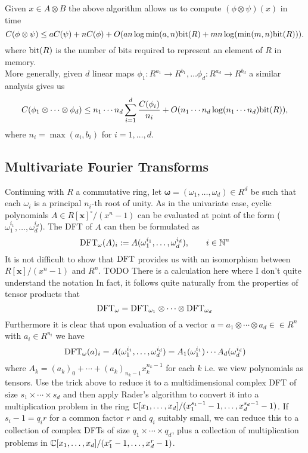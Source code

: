 Given $x \in A \otimes B$ the above algorithm allows us to compute $(\phi \otimes \psi) (x)$ in time
\[
    C(\phi \otimes \psi) \leq aC(\psi) + nC(\phi) + O(a n \log \min(a, n) \textrm{bit}(R) + m n \log( \min (m, n)\textrm{bit}(R))).
\]
where $\textrm{bit}(R)$ is the number of bits required to represent an element of $R$ in memory.\\
More generally, given $d$ linear maps $\phi_1: R^{a_1} \to R^{b_1}, \ldots \phi_d: R^{a_d} \to R^{b_d}$ a similar analysis gives us
\[
    C(\phi_1 \otimes \cdots \otimes \phi_d) \leq n_1\cdots n_d \sum^d_{i = 1} \frac{C(\phi_i)}{n_i} + O(n_1\cdots n_d \log (n_1 \cdots n_d) \textrm{bit}(R)),
\]
where $n_i = \max(a_i, b_i)$ for $i = 1, \ldots, d$.


\subsection{Multivariate Fourier Transforms}%
\label{sub:multivariate_fourier_transforms}

Continuing with $R$ a commutative ring, let $\mathbf{\omega} = (\omega_1, \ldots, \omega_d) \in R^d$ be such that each $\omega_i$ is a principal $n_i$-th root of unity. As in the univariate case, cyclic polynomials $A \in R[\mathbf{x}]^\circ/(x^n - 1)$ can be evaluated at point of the form ($\omega_1^{i_1}, \ldots, \omega_d^{i_d}$). The DFT of $A$ can then be formulated as 
\[
    \textrm{DFT}_{\mathbf{\omega}}(A)_i := A(\omega_1^{i_1}, \ldots, \omega_d^{i_d}), \qquad i \in {\mathbb N}^n
\]
It is not difficult to show that $\textrm{DFT}$ provides us with an isomorphism between $R[\mathbf{x}]/(x^n - 1)$ and $R^n$. TODO There is a calculation here where I don't quite understand the notation
In fact, it follows quite naturally from the properties of tensor products that
\[
    \textrm{DFT}_{\mathbf{\omega}} = \textrm{DFT}_{\omega_1} \otimes \cdots \otimes \textrm{DFT}_{\omega_d}
\]
Furthermore it is clear that upon evaluation of a vector $a = a_1 \otimes \cdots \otimes a_d \in \in R^n$ with $a_i \in R^{n_i}$ we have
\[
    \textrm{DFT}_{\mathbf{\omega}}(a)_i = A(\omega_1^{i_1}, \ldots, \omega_d^{i_d}) = A_1(\omega_1^{i_1}) \cdots A_d(\omega_d^{i_d})
\]
where $A_k = (a_k)_0 + \cdots + (a_k)_{n_k - 1}x_k^{n_k - 1}$ for each $k$ i.e. we view polynomials as tensors.
Use the trick above to reduce it to a multidimensional complex DFT of size $s_1 \times \cdots \times s_d$ and then apply Rader's algorithm to convert it into a multiplication problem in the ring ${\mathbb C}[x_1, \ldots, x_d] / (x_1^{s_1 - 1} - 1, \ldots, x_d^{s_d - 1} - 1)$. If $s_i - 1 = q_i r$ for a common factor $r$ and $q_i$ suitably small, we can reduce this to a collection of complex DFTs of size $q_1 \times \cdots \times q_d$, plus a collection of multiplication problems in ${\mathbb C}[x_1, \ldots, x_d]/(x_1^r - 1, \ldots, x_d^r - 1)$.

